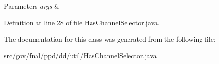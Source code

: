 \begin{DoxyParams}{Parameters}
{\em args} & \\
\hline
\end{DoxyParams}


Definition at line 28 of file Has\-Channel\-Selector.\-java.



The documentation for this class was generated from the following file\-:\begin{DoxyCompactItemize}
\item 
src/gov/fnal/ppd/dd/util/\hyperlink{HasChannelSelector_8java}{Has\-Channel\-Selector.\-java}\end{DoxyCompactItemize}
